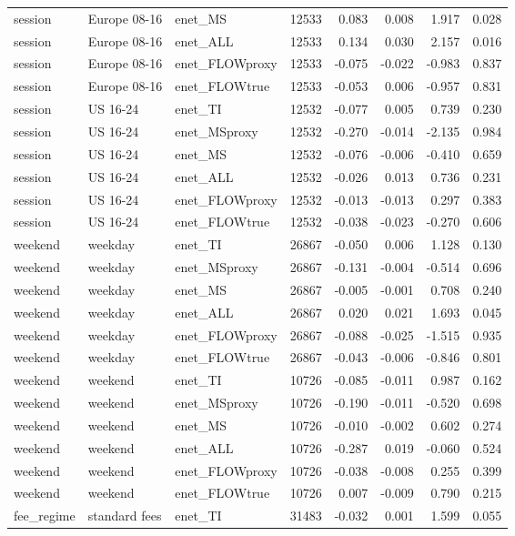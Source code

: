 \begin{tabular}{lllrrrrr}
session & Europe 08-16 & enet_MS & 12533 & 0.083 & 0.008 & 1.917 & 0.028 \\
session & Europe 08-16 & enet_ALL & 12533 & 0.134 & 0.030 & 2.157 & 0.016 \\
session & Europe 08-16 & enet_FLOWproxy & 12533 & -0.075 & -0.022 & -0.983 & 0.837 \\
session & Europe 08-16 & enet_FLOWtrue & 12533 & -0.053 & 0.006 & -0.957 & 0.831 \\
session & US 16-24 & enet_TI & 12532 & -0.077 & 0.005 & 0.739 & 0.230 \\
session & US 16-24 & enet_MSproxy & 12532 & -0.270 & -0.014 & -2.135 & 0.984 \\
session & US 16-24 & enet_MS & 12532 & -0.076 & -0.006 & -0.410 & 0.659 \\
session & US 16-24 & enet_ALL & 12532 & -0.026 & 0.013 & 0.736 & 0.231 \\
session & US 16-24 & enet_FLOWproxy & 12532 & -0.013 & -0.013 & 0.297 & 0.383 \\
session & US 16-24 & enet_FLOWtrue & 12532 & -0.038 & -0.023 & -0.270 & 0.606 \\
weekend & weekday & enet_TI & 26867 & -0.050 & 0.006 & 1.128 & 0.130 \\
weekend & weekday & enet_MSproxy & 26867 & -0.131 & -0.004 & -0.514 & 0.696 \\
weekend & weekday & enet_MS & 26867 & -0.005 & -0.001 & 0.708 & 0.240 \\
weekend & weekday & enet_ALL & 26867 & 0.020 & 0.021 & 1.693 & 0.045 \\
weekend & weekday & enet_FLOWproxy & 26867 & -0.088 & -0.025 & -1.515 & 0.935 \\
weekend & weekday & enet_FLOWtrue & 26867 & -0.043 & -0.006 & -0.846 & 0.801 \\
weekend & weekend & enet_TI & 10726 & -0.085 & -0.011 & 0.987 & 0.162 \\
weekend & weekend & enet_MSproxy & 10726 & -0.190 & -0.011 & -0.520 & 0.698 \\
weekend & weekend & enet_MS & 10726 & -0.010 & -0.002 & 0.602 & 0.274 \\
weekend & weekend & enet_ALL & 10726 & -0.287 & 0.019 & -0.060 & 0.524 \\
weekend & weekend & enet_FLOWproxy & 10726 & -0.038 & -0.008 & 0.255 & 0.399 \\
weekend & weekend & enet_FLOWtrue & 10726 & 0.007 & -0.009 & 0.790 & 0.215 \\
fee_regime & standard fees & enet_TI & 31483 & -0.032 & 0.001 & 1.599 & 0.055 \\

\end{tabular}
